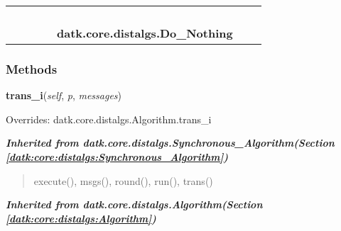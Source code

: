     \label{datk:core:distalgs:Do_Nothing}
\begin{tabular}{cccccccc}
\multicolumn{2}{r}{\settowidth{\BCL}{datk.core.distalgs.Algorithm}\multirow{2}{\BCL}{datk.core.distalgs.Algorithm}}
&&
&&
  \\\cline{3-3}
  &&\multicolumn{1}{c|}{}
&&
&&
  \\
\multicolumn{4}{r}{\settowidth{\BCL}{datk.core.distalgs.Synchronous\_Algorithm}\multirow{2}{\BCL}{datk.core.distalgs.Synchronous\_Algorithm}}
&&
  \\\cline{5-5}
  &&&&\multicolumn{1}{c|}{}
&&
  \\
&&&&\multicolumn{2}{l}{\textbf{datk.core.distalgs.Do\_Nothing}}
\end{tabular}



  \subsubsection{Methods}

    \vspace{0.5ex}

\hspace{.8\funcindent}\begin{boxedminipage}{\funcwidth}

    \raggedright \textbf{trans\_i}(\textit{self}, \textit{p}, \textit{messages})

\setlength{\parskip}{2ex}
\setlength{\parskip}{1ex}
      Overrides: datk.core.distalgs.Algorithm.trans\_i

    \end{boxedminipage}


\large{\textbf{\textit{Inherited from datk.core.distalgs.Synchronous\_Algorithm\textit{(Section \ref{datk:core:distalgs:Synchronous_Algorithm})}}}}

\begin{quote}
execute(), msgs(), round(), run(), trans()
\end{quote}

\large{\textbf{\textit{Inherited from datk.core.distalgs.Algorithm\textit{(Section \ref{datk:core:distalgs:Algorithm})}}}}

